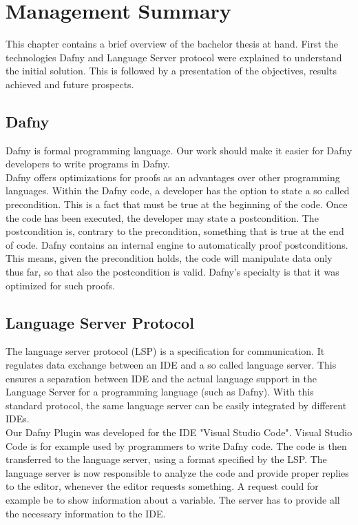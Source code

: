 \section{Management Summary}
\label{section:management_summary}
This chapter contains a brief overview of the bachelor thesis at hand.
First the technologies Dafny and Language Server protocol were explained to understand the initial solution.
This is followed by a presentation of the objectives, results achieved and future prospects.

\subsection{Dafny}
\label{section:introduction:dafny}
Dafny is formal programming language.
Our work should make it easier for Dafny developers to write programs in Dafny. \\

Dafny offers optimizations for proofs as an advantages over other programming languages.
Within the Dafny code, a developer has the option to state a so called precondition.
This is a fact that must be true at the beginning of the code.
Once the code has been executed, the developer may state a postcondition.
The postcondition is, contrary to the precondition, something that is true at the end of code.
Dafny contains an internal engine to automatically proof postconditions.
This means, given the precondition holds, the code will manipulate data only thus far, so that also the postcondition is valid.
Dafny's specialty is that it was optimized for such proofs.

\subsection{Language Server Protocol}
The language server protocol (LSP) is a specification for communication.
It regulates data exchange between an IDE and a so called language server.
This ensures a separation between IDE and the actual language support in the Language Server for a programming language (such as Dafny).
With this standard protocol, the same language server can be easily integrated by different IDEs. \\

Our Dafny Plugin was developed for the IDE "Visual Studio Code".
Visual Studio Code is for example used by programmers to write Dafny code.
The code is then transferred to the language server, using a format specified by the LSP.
The language server is now responsible to analyze the code and provide proper replies to the editor, whenever the editor requests something.
A request could for example be to show information about a variable.
The server has to provide all the necessary information to the IDE.\\

